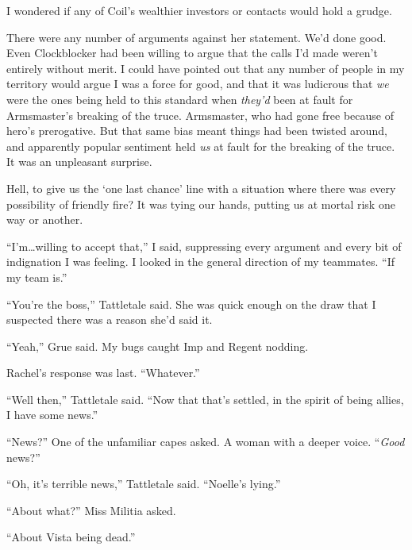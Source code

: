 I wondered if any of Coil's wealthier investors or contacts would hold a grudge.



There were any number of arguments against her statement.  We'd done good.  Even Clockblocker had been willing to argue that the calls I'd made weren't entirely without merit.  I could have pointed out that any number of people in my territory would argue I was a force for good, and that it was ludicrous that \emph{we} were the ones being held to this standard when \emph{they'd }been at fault for Armsmaster's breaking of the truce.  Armsmaster, who had gone free because of hero's prerogative.  But that same bias meant things had been twisted around, and apparently popular sentiment held \emph{us} at fault for the breaking of the truce.  It was an unpleasant surprise.



Hell, to give us the `one last chance' line with a situation where there was every possibility of friendly fire?  It was tying our hands, putting us at mortal risk one way or another.



``I'm\ldots willing to accept that,'' I said, suppressing every argument and every bit of indignation I was feeling.  I looked in the general direction of my teammates.  ``If my team is.''



``You're the boss,'' Tattletale said.  She was quick enough on the draw that I suspected there was a reason she'd said it.



``Yeah,'' Grue said.  My bugs caught Imp and Regent nodding.



Rachel's response was last.  ``Whatever.''



``Well then,'' Tattletale said.  ``Now that that's settled, in the spirit of being allies, I have some news.''



``News?''  One of the unfamiliar capes asked.  A woman with a deeper voice.  ``\emph{Good }news?''



``Oh, it's terrible news,'' Tattletale said.  ``Noelle's lying.''



``About what?'' Miss Militia asked.



``About Vista being dead.''



